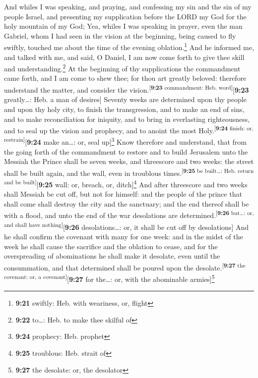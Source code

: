  And whiles I was speaking, and praying, and confessing
my sin and the sin of my people Israel, and presenting my supplication
before the LORD my God for the holy mountain of my God; 
Yea, whiles I was speaking in prayer, even the man Gabriel, whom I had
seen in the vision at the beginning, being caused to fly swiftly,
touched me about the time of the evening oblation.\footnote{\textbf{9:21}
  swiftly: Heb. with weariness, or, flight}  And he
informed me, and talked with me, and said, O Daniel, I am now come forth
to give thee skill and understanding.\footnote{\textbf{9:22} to\ldots:
  Heb. to make thee skilful of}  At the beginning of thy
supplications the commandment came forth, and I am come to shew thee;
for thou art greatly beloved: therefore understand the matter, and
consider the vision.\textsuperscript{{[}\textbf{9:23} commandment: Heb.
word{]}}{[}\textbf{9:23} greatly\ldots: Heb. a man of desires{]}
 Seventy weeks are determined upon thy people and upon
thy holy city, to finish the transgression, and to make an end of sins,
and to make reconciliation for iniquity, and to bring in everlasting
righteousness, and to seal up the vision and prophecy, and to anoint the
most Holy.\textsuperscript{{[}\textbf{9:24} finish: or,
restrain{]}}{[}\textbf{9:24} make an\ldots: or, seal up{]}\footnote{\textbf{9:24}
  prophecy: Heb. prophet}  Know therefore and understand,
that from the going forth of the commandment to restore and to build
Jerusalem unto the Messiah the Prince shall be seven weeks, and
threescore and two weeks: the street shall be built again, and the wall,
even in troublous times.\textsuperscript{{[}\textbf{9:25} be
built\ldots: Heb. return and be built{]}}{[}\textbf{9:25} wall: or,
breach, or, ditch{]}\footnote{\textbf{9:25} troublous: Heb. strait of}
 And after threescore and two weeks shall Messiah be cut
off, but not for himself: and the people of the prince that shall come
shall destroy the city and the sanctuary; and the end thereof shall be
with a flood, and unto the end of the war desolations are
determined.\textsuperscript{{[}\textbf{9:26} but\ldots: or, and shall
have nothing{]}}{[}\textbf{9:26} desolations\ldots: or, it shall be cut
off by desolations{]}  And he shall confirm the covenant
with many for one week: and in the midst of the week he shall cause the
sacrifice and the oblation to cease, and for the overspreading of
abominations he shall make it desolate, even until the consummation, and
that determined shall be poured upon the
desolate.\textsuperscript{{[}\textbf{9:27} the covenant: or, a
covenant{]}}{[}\textbf{9:27} for the\ldots: or, with the abominable
armies{]}\footnote{\textbf{9:27} the desolate: or, the desolator}

